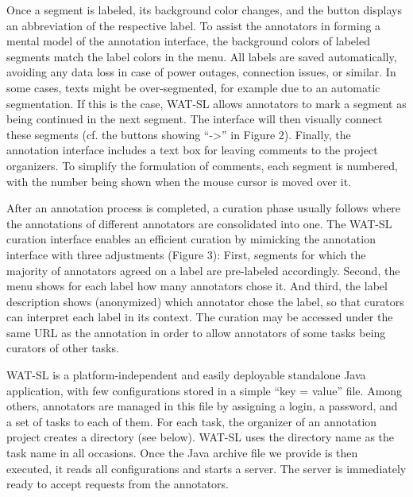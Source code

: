 \begin{description}
    Once a segment is labeled, its background color
    changes, and the button displays an abbreviation
    of the respective label. To assist the annotators in
    forming a mental model of the annotation interface, the background colors of labeled segments
    match the label colors in the menu. All labels are
    saved automatically, avoiding any data loss in case
    of power outages, connection issues, or similar.
    In some cases, texts might be over-segmented,
    for example due to an automatic segmentation. If
    this is the case, WAT-SL allows annotators to mark
    a segment as being continued in the next segment.
    The interface will then visually connect these segments (cf. the buttons showing “->” in Figure 2).
    Finally, the annotation interface includes a text
    box for leaving comments to the project organizers. To simplify the formulation of comments,
    each segment is numbered, with the number being
    shown when the mouse cursor is moved over it.
   
    After an annotation process is completed, a curation phase usually follows where the annotations
    of different annotators are consolidated into one.
    The WAT-SL curation interface enables an efficient curation by mimicking the annotation interface with three adjustments (Figure 3): First, segments for which the majority of annotators agreed
    on a label are pre-labeled accordingly. Second, the
    menu shows for each label how many annotators
    chose it. And third, the label description shows
    (anonymized) which annotator chose the label, so
    that curators can interpret each label in its context.
    The curation may be accessed under the same
    URL as the annotation in order to allow annotators
    of some tasks being curators of other tasks.
   
    WAT-SL is a platform-independent and easily deployable standalone Java application, with few
    configurations stored in a simple “key = value”
    file. Among others, annotators are managed in this
    file by assigning a login, a password, and a set of
    tasks to each of them. For each task, the organizer
    of an annotation project creates a directory (see
    below). WAT-SL uses the directory name as the
    task name in all occasions. Once the Java archive
    file we provide is then executed, it reads all configurations and starts a server. The server is immediately ready to accept requests from the annotators.

  \end{description}

